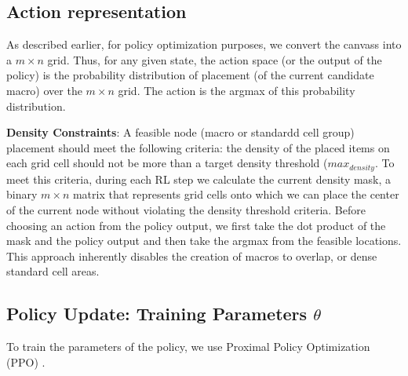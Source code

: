 \subsection{Action representation} As described earlier, for policy optimization purposes, we convert the canvass into a $m\times n$ grid. Thus, for any given state, the action space (or the output of the policy) is the probability distribution of placement (of the current candidate macro) over the $m\times n$ grid. The action is the argmax of this probability distribution. 

\textbf{Density Constraints}: A feasible node (macro or standardd cell group) placement should meet the following criteria: the density of the placed items on each grid cell should not be more than a target density threshold ($max_{density}$. To meet this criteria, during each RL step we calculate the current density mask, a binary $m\times n$ matrix that represents grid cells onto which we can place the center of the current node without violating the density threshold criteria. Before choosing an action from the policy output, we first take the dot product of the mask and the policy output and then take the argmax from the feasible locations. This approach inherently disables the creation of macros to overlap, or dense standard cell areas.


\subsection{Policy Update: Training Parameters $\theta$}
To train the parameters of the policy, we use Proximal Policy Optimization (PPO) \citep{}. 


